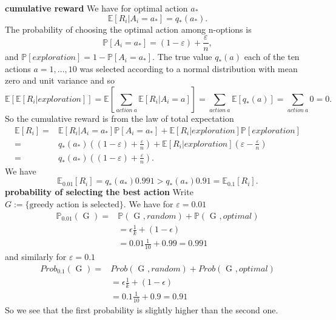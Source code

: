 \documentclass[answers]{exam}
\theoremstyle{definition}
\theoremstyle{remark}
\newcommand{\Prob}{\mathbb{P}}
\newcommand{\Proba}[1]{\mathbb{P}\left[#1\right]}
\newcommand{\Exp}{\mathbb{E}}
\newcommand{\Expe}[1]{\mathbb{E}\left[ #1\right] }
\newcommand{\e}{\varepsilon}
\begin{document}
\begin{solution}
    
\textbf{ cumulative reward}
We have for optimal action $a_{*}$
\begin{equation}
\Expe{R_{i}|A_{i}=a_{*}}=q_{*}(a_{*}).    
\end{equation}
The probability of choosing the optimal action among n-options is
\begin{equation}
\Proba{A_{i}=a_{*}}=(1-\e)+\frac{\e}{n},
\end{equation}
and $\Proba{exploration}=1- \Proba{A_{i}=a_{*}}$. The true value $q_{*}(a)$ each of the ten actions $a=1,...,10$ was selected according to a normal distribution with mean zero and unit variance and so
\begin{equation}
\Expe{\Expe{R_{i}|exploration}}=\Expe{\sum_{action~a}\Expe{R_{i}|A_{i}=a}} =\sum_{action~a}\Expe{q_{*}(a)}=\sum_{action~a}0=0.   
\end{equation}
So the cumulative reward is from the law of total expectation
\begin{align*}
\Expe{R_{i}}=&\Expe{R_{i}|A_{i}=a_{*}}\Proba{A_{i}=a_{*}}+\Expe{R_{i}|exploration}\Proba{exploration}\\    
=&q_{*}(a_{*})((1-\e)+\frac{\e}{n})+\Expe{R_{i}|exploration}(\e-\frac{\e}{n})\\   
=&q_{*}(a_{*})((1-\e)+\frac{\e}{n}).
\end{align*}
We have
\begin{equation}
\Exp_{0.01}[R_{i}]=q_{*}(a_{*})0.991>q_{*}(a_{*})0.91=\Exp_{0.1}[R_{i}].   
\end{equation}
\textbf{probability of selecting the best action}
Write $G:=\{\text{greedy action is selected}\}$. We have for $\e=0.01$
\begin{align*}
\Prob_{0.01}(\text{ G })=&\Prob(\text{ G },random)+\Prob(\text{ G },optimal)    \\
&=\epsilon\frac{1}{k}+(1-\epsilon)\\
&=0.01\frac{1}{10}+0.99=0.991
\end{align*}  
and similarly for $\e=0.1$
\begin{align*}
Prob_{0.1}(\text{ G })=&Prob(\text{ G },random)+Prob(\text{ G },optimal)    \\
&=\epsilon\frac{1}{k}+(1-\epsilon)\\
&=0.1\frac{1}{10}+0.9=0.91
\end{align*}  
So we see that the first probability is slightly higher than the second one.



\end{solution}
\end{document}
